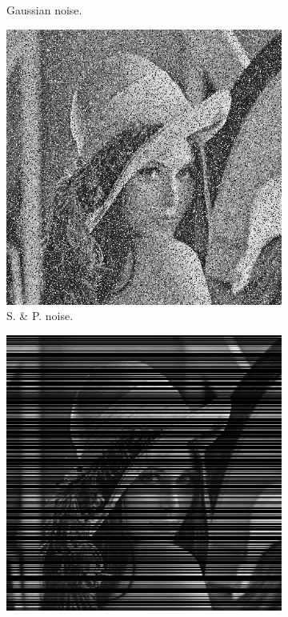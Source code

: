 \documentclass[abstracton]{scrreprt}
\begin{document}
\begin{figure}[!ht]
\begin{subfigure}[b]{0.24\textwidth}
                    \caption{Gaussian noise.}
                \end{subfigure}
                \begin{subfigure}[b]{0.24\textwidth}
                    \includegraphics[width=\textwidth]{img/images/lena_sp_noise.png}
                    \caption{S. \& P. noise.}
                \end{subfigure}
                \begin{subfigure}[b]{0.24\textwidth}
                    \includegraphics[width=\textwidth]{img/images/lena_inpaint.png}

\end{subfigure}
\end{figure}
\end{document}
